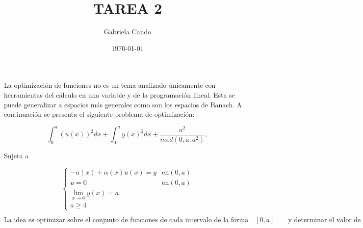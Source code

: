 \documentclass[11pt]{report}
\title{TAREA 2}
\author{Gabriela Cando}
\date{\today}
\begin{document}
\maketitle

La optimización de funciones no es un tema analizado únicamente con herramientas del cálculo en
una variable y de la programación lineal. Esta se puede generalizar a espacios más generales como
son los espacios de Banach. A continuación se presenta el siguiente problema de optimización:

\[
 \int_{0}^{a} (u(x))^2 dx + \int_{0}^{a} y(x)^2 dx + \dfrac{a^2}{med(0,a,a^2)}, 
\]

Sujeta a 

\[
\begin{cases}
-u(x) + \alpha(x)u(x)= y & \text{en}  {(0,a)} \\
u=0 & \text{en}  {(0,a)} \\
\lim_{x \to 0} y(x) = a \\
a \geq 4
\end{cases}
\]

\[
 \text{La idea es optimizar sobre el conjunto de funciones de cada intervalo de la forma} \quad [0,a] \qquad \text{y determinar el valor de}  \quad a \geq 4  \qquad \text{que indique el mejor intervalo de trabajo.} 
\]
\end{document}
